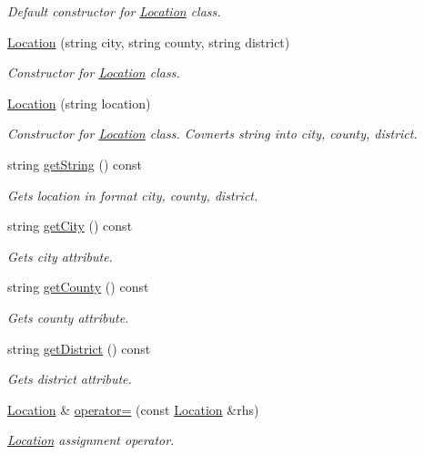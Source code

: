 \begin{DoxyCompactItemize}
\begin{DoxyCompactList}\small\item\em Default constructor for \hyperlink{class_location}{Location} class. \end{DoxyCompactList}\item 
\hyperlink{class_location_adde1be165887d4738c25164191107f8a}{Location} (string city, string county, string district)
\begin{DoxyCompactList}\small\item\em Constructor for \hyperlink{class_location}{Location} class. \end{DoxyCompactList}\item 
\hyperlink{class_location_aa41373bb46efc066f79ab697c56b0da3}{Location} (string location)
\begin{DoxyCompactList}\small\item\em Constructor for \hyperlink{class_location}{Location} class. Covnerts string into city, county, district. \end{DoxyCompactList}\item 
string \hyperlink{class_location_a9584236ecf93acc9192ece00583482ab}{get\+String} () const 
\begin{DoxyCompactList}\small\item\em Gets location in format city, county, district. \end{DoxyCompactList}\item 
string \hyperlink{class_location_ac682ee57f401c50a88d362305d159640}{get\+City} () const 
\begin{DoxyCompactList}\small\item\em Gets city attribute. \end{DoxyCompactList}\item 
string \hyperlink{class_location_aa200afd4afd7898f16c5e54c533da4ef}{get\+County} () const 
\begin{DoxyCompactList}\small\item\em Gets county attribute. \end{DoxyCompactList}\item 
string \hyperlink{class_location_a989ce807f112210952bad662d38185dd}{get\+District} () const 
\begin{DoxyCompactList}\small\item\em Gets district attribute. \end{DoxyCompactList}\item 
\hyperlink{class_location}{Location} \& \hyperlink{class_location_a41a15b0cfd590d365e31f613d32eebd1}{operator=} (const \hyperlink{class_location}{Location} \&rhs)
\begin{DoxyCompactList}\small\item\em \hyperlink{class_location}{Location} assignment operator. \end{DoxyCompactList}\end{DoxyCompactItemize}
